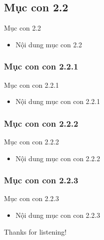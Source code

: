 \documentclass{beamer}
\begin{document}
\subsection{Mục con 2.2}
\begin{frame}{Mục con 2.2}
\begin{itemize}
\item Nội dung mục con 2.2
\end{itemize}
\end{frame}

\subsubsection{Mục con con 2.2.1}
\begin{frame}{Mục con con 2.2.1}
\begin{itemize}
\item Nội dung mục con con 2.2.1
\end{itemize}
\end{frame}

\subsubsection{Mục con con 2.2.2}
\begin{frame}{Mục con con 2.2.2}
\begin{itemize}
\item Nội dung mục con con 2.2.2
\end{itemize}
\end{frame}

\subsubsection{Mục con con 2.2.3}
\begin{frame}{Mục con con 2.2.3}
\begin{itemize}
\item Nội dung mục con con 2.2.3
\end{itemize}
\end{frame}

\begin{frame}{}
\centering
\Huge{Thanks for listening!}
\end{frame}
\end{document}
